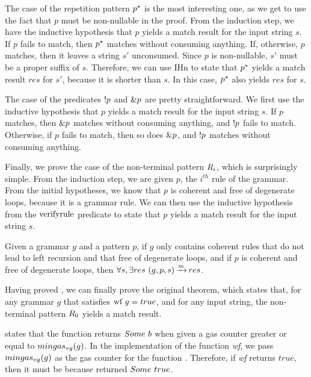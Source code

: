 The case of the repetition pattern $p^\star$ is the most interesting one,
as we get to use the fact that $p$ must be non-nullable in the proof.
From the induction step, we have the inductive hypothesis that
$p$ yields a match result for the input string $s$.
If $p$ fails to match, then $p^\star$ matches without consuming anything.
If, otherwise, $p$ matches, then it leaves a string $s'$ unconsumed.
Since $p$ is non-nullable, $s'$ must be a proper suffix of $s$.
Therefore, we can use IHn to state that $p^\star$
yields a match result $res$ for $s'$, because it is shorter than $s$.
In this case, $p^\star$ also yields $res$ for $s$.

The case of the predicates $!p$ and $\&p$ are pretty straightforward.
We first use the inductive hypothesis that $p$
yields a match result for the input string $s$.
If $p$ matches,
then $\&p$ matches without consuming anything,
and $!p$ fails to match.
Otherwise, if $p$ fails to match,
then so does $\&p$,
and $!p$ matches without consuming anything.

Finally, we prove the case of the non-terminal pattern $R_{i}$,
which is surprisingly simple.
From the induction step,
we are given $p$, the $i^{th}$ rule of the grammar.
From the initial hypotheses,
we know that $p$ is coherent and free of degenerate loops,
because it is a grammar rule.
We can then use the inductive hypothesis
from the $\text{verifyrule}{}$ predicate to
state that $p$ yields a match result for the input string $s$.
\begin{theorem}
    \label{theorem:wf-correctness-generalized}
    Given a grammar $g$ and a pattern $p$,
    if $g$ only contains coherent rules
    that do not lead to left recursion
    and that free of degenerate loops,
    and if $p$ is coherent
    and free of degenerate loops,
    then $\forall s, \exists res\ \Matches{g}{p}{s}{res}$.
\end{theorem}
Having proved ,
we can finally prove the original theorem,
which states that, for any grammar $g$
that satisfies $\text{wf}\ g = true$,
and for any input string,
the non-terminal pattern $R_{0}$
yields a match result.

 states that
the function \textit{\verifygrammarname{}} returns
$Some\ b$ when given a gas counter greater or equal
to $mingas_{vg}(g)$.
In the implementation of the function \textit{wf},
we pass $mingas_{vg}(g)$ as the gas counter
for the function \textit{\verifygrammarname{}}.
Therefore, if \textit{wf} returns $true$,
then it must be because \textit{\verifygrammarname{}}
returned $Some\ true$.

